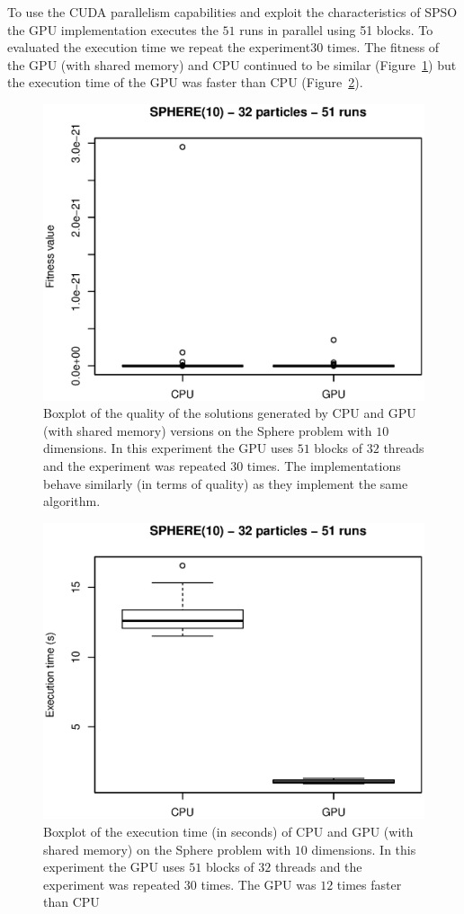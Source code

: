 \documentclass{article}
\begin{document}
    To use the CUDA parallelism capabilities and exploit the characteristics of SPSO the GPU implementation executes the $51$ runs in parallel using 51 blocks. To evaluated the execution time we repeat the experiment30 times. The fitness of the GPU (with shared memory) and CPU continued to be similar (Figure~\ref{fig:sphere10_32particles_multi_runs_fitness}) but the execution time of the GPU was faster than CPU (Figure~\ref{fig:sphere10_32particles_multi_runs_time}).

    \begin{figure}[!htb]
        \centering
        \includegraphics[width=.7\textwidth]{../img/sphere10_32particles_multi_runs_fitness.eps}
        \caption{Boxplot of the quality of the solutions generated by CPU and GPU (with shared memory) versions on the Sphere problem with $10$ dimensions. In this experiment the GPU uses $51$ blocks of $32$ threads and the experiment was repeated $30$ times. The implementations behave similarly (in terms of quality) as they implement the same algorithm.}
        \label{fig:sphere10_32particles_multi_runs_fitness}
    \end{figure}


    \begin{figure}[!htb]
        \centering
        \includegraphics[width=.7\textwidth]{../img/sphere10_32particles_multi_runs_time.eps}
        \caption{Boxplot of the execution time (in seconds) of CPU and GPU (with shared memory) on the Sphere problem with $10$ dimensions. In this experiment the GPU uses $51$ blocks of $32$ threads and the experiment was repeated $30$ times. The GPU was $12$ times faster than CPU}
        \label{fig:sphere10_32particles_multi_runs_time}
    \end{figure}
\end{document}
